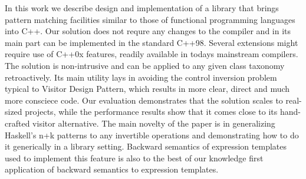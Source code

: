 \documentclass[preprint]{sigplanconf}
\begin{document}
In this work we describe design and implementation of a library that brings 
pattern matching facilities similar to those of functional programming languages 
into C++. Our solution does not requre any changes to the compiler and in its 
main part can be implemented in the standard C++98. Several extensions might 
require use of C++0x features, readily available in todays mainstream compilers.
The solution is non-intrusive and can be applied to any given class taxonomy 
retroactively. Its main utility lays in avoiding the control inversion problem 
typical to Visitor Design Pattern, which results in more clear, direct and much 
more consciece code. Our evaluation demonstrates that the solution scales to 
real-sized projects, while the performance results show that it comes close to 
its hand-crafted visitor alternative. The main novelty of the paper is in 
generalizing Haskell's n+k patterns to any invertible operations and 
demonstrating how to do it generically in a library setting. Backward semantics 
of expression templates used to implement this feature is also to the best of 
our knowledge first application of backward semantics to expression templates.

\end{document}
